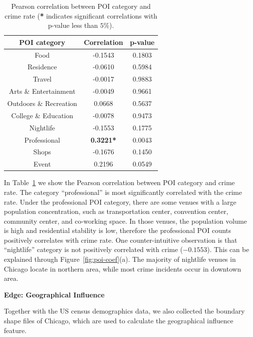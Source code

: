 \begin{table}[h]
\centering
\caption{Pearson correlation between POI category and crime rate (\textbf{*} indicates significant correlations with p-value less than $5\%$).}

\label{tb:poi-corr}
\begin{tabular}{|c ||c|c|}
\hline
POI category & Correlation & p-value \\ \hline \hline
Food & -0.1543 &  0.1803 \\ \hline
Residence &  -0.0610 &  0.5984 \\ \hline
Travel & -0.0017 &  0.9883 \\ \hline
Arts \& Entertainment & -0.0049 &  0.9661 \\ \hline
Outdoors \& Recreation &  0.0668 &  0.5637 \\ \hline
College \& Education & -0.0078 &  0.9473 \\ \hline
Nightlife &  -0.1553 &  0.1775 \\ \hline
Professional & \textbf{0.3221*} &  0.0043 \\ \hline
Shops & -0.1676 &  0.1450 \\ \hline
Event & 0.2196 &  0.0549  \\ \hline
\end{tabular}
\end{table}



In Table~\ref{tb:poi-corr} we show the Pearson correlation between POI category and crime rate. The category ``professional''  is most significantly correlated with the crime rate. Under the professional POI category, there are some venues with a large population concentration, such as transportation center, convention center, community center, and co-working space. In those venues, the  population volume is high and residential stability is low, therefore the professional POI counts positively correlates with crime rate.  One counter-intuitive observation is that ``nightlife'' category is not positively correlated with crime ($-0.1553$). This can be explained through Figure~\ref{fig:poi-coef}(a). The majority of nightlife venues in Chicago locate in northern area, while most crime incidents occur in downtown area.








\textbf{Edge: Geographical Influence}

Together with the US census demographics data, we also collected the boundary shape files of Chicago, which are used to calculate the geographical influence feature.

